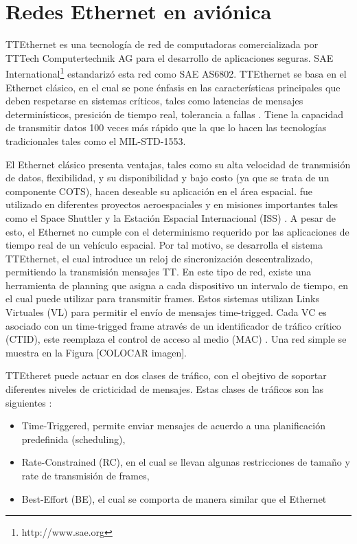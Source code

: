 \section{Redes Ethernet en aviónica}
TTEthernet es una tecnología de red de computadoras comercializada por TTTech Computertechnik AG para el desarrollo de aplicaciones seguras. SAE International\footnote{http://www.sae.org} estandarizó esta red como SAE AS6802. TTEthernet se basa en el Ethernet clásico, en el cual se pone énfasis en las características principales que deben respetarse en sistemas críticos, tales como latencias de mensajes determinísticos, presición de tiempo real, tolerancia a fallas \citep{Loveless15}. Tiene la capacidad de transmitir datos 100 veces más rápido que la que lo hacen las tecnologías tradicionales tales como el MIL-STD-1553.

El Ethernet clásico presenta ventajas, tales como su alta velocidad de transmisión de datos, flexibilidad, y su disponibilidad y bajo costo (ya que se trata de un componente COTS)\citep{Loveless15}, hacen deseable su aplicación en el área espacial.  fue utilizado en diferentes proyectos aeroespaciales y en misiones importantes tales como el Space Shuttler y la Estación Espacial Internacional (ISS) \citep{Loveless15}. A pesar de esto, el Ethernet no cumple con el determinismo requerido por las aplicaciones de tiempo real de un vehículo espacial. Por tal motivo, se desarrolla el sistema TTEthernet, el cual introduce un reloj de sincronización descentralizado, permitiendo la transmisión mensajes \ac{TT}. En este tipo de red, existe una herramienta de planning que asigna a cada dispositivo un intervalo de tiempo, en el cual puede utilizar para transmitir frames. Estos sistemas utilizan Links Virtuales (VL) para permitir el envío de mensajes time-trigged. Cada VC es asociado con un time-trigged frame através de un identificador de tráfico crítico (CTID), este reemplaza el control de acceso al medio (MAC) \citep{Loveless15}. Una red simple se muestra en la Figura [COLOCAR imagen].


TTEtheret puede actuar en dos clases de tráfico, con el obejtivo de soportar diferentes niveles de cricticidad de mensajes. Estas clases de tráficos son las siguientes \citep{Loveless15} \citep{Steiner13}:
\begin{itemize}
	\item Time-Triggered, permite enviar mensajes de acuerdo a una planificación predefinida (scheduling),
	\item Rate-Constrained (RC), en el cual se llevan algunas restricciones de tamaño y rate de transmisión de frames,
	\item Best-Effort (BE), el cual se comporta de manera similar que el Ethernet
\end{itemize}

